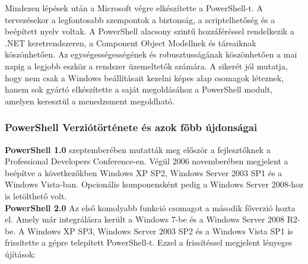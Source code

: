 \documentclass[12pt,oneside,justify,table]{book}
\begin{document}
Mindezen lépések után a Microsoft végre elkészítette a PowerShell-t. A tervezésekor a legfontosabb szempontok a biztonság, a scriptelhetőség és a beépített nyelv voltak. A PowerShell alacsony szintű hozzáféréssel rendelkezik a .NET keretrendszeren, a Component Object Modellnek és társaiknak köszönhetően. Az egységességességének és robusztusságának köszönhetően a mai napig a legjobb eszköz a rendszer üzemeltetők számára. A sikerét jól mutatja, hogy nem csak a Windows beállításait kezelni képes alap csomagok léteznek, hanem sok gyártó elkészítette a saját megoldásához a PowerShell modult, amelyen keresztül a menedzsment megoldható.
\cite{WindowsPowerShellUnleashed}

\subsubsection{PowerShell Verziótörténete és azok főbb újdonságai}
\noindent\textbf{PowerShell 1.0}
 szeptemberében mutatták meg először a fejlesztőknek a Professional Developers Conference-en. 
Végül 2006 novemberében megjelent a beépítve a következőkben Windows XP SP2, Windows Server 2003 SP1 és a Windows Vista-ban. Opcionális komponensként pedig a Windows Server 2008-hoz is letölthető volt.\\
\break
\noindent\textbf{PowerShell 2.0}
\newline Az első komolyabb funkció csomagot a második főverzió hozta el. Amely már integrálásra került a Windows 7-be és a Windows Server 2008 R2-be. A Windows XP SP3, Windows Server 2003 SP2 és a Windows Vista SP1 is frissítette a gépre telepített PowerShell-t.
Ezzel a frissítéssel megjelent lényeges újítások:
\end{document}
